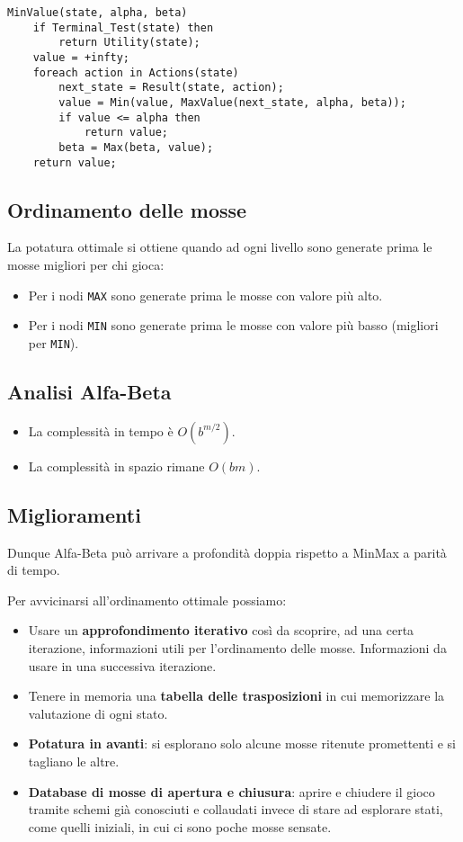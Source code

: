 \begin{lstlisting}[style=pseudo-style]
MinValue(state, alpha, beta)
	if Terminal_Test(state) then
		return Utility(state);
	value = +infty;
	foreach action in Actions(state)
		next_state = Result(state, action);
		value = Min(value, MaxValue(next_state, alpha, beta));
		if value <= alpha then
			return value;
		beta = Max(beta, value);
	return value;
\end{lstlisting}

\subsection{Ordinamento delle mosse}
La potatura ottimale si ottiene quando ad ogni livello sono generate prima le mosse migliori per chi gioca:
\begin{itemize}
	\item Per i nodi \verb|MAX| sono generate prima le mosse con valore pi\`u alto.
	\item Per i nodi \verb|MIN| sono generate prima le mosse con valore pi\`u basso (migliori per \verb|MIN|).
\end{itemize}

\subsection{Analisi Alfa-Beta}
\begin{itemize}
	\item La complessit\`a in tempo \`e $O(b^{m/2})$.
	\item La complessit\`a in spazio rimane $O(bm)$.
\end{itemize}

\subsection{Miglioramenti}
Dunque Alfa-Beta pu\`o arrivare a profondit\`a doppia rispetto a MinMax a parit\`a di tempo.

Per avvicinarsi all'ordinamento ottimale possiamo:
\begin{itemize}
	\item Usare un \textbf{approfondimento iterativo} cos\`i da scoprire,
	      ad una certa iterazione, informazioni utili per l'ordinamento delle mosse. Informazioni da usare
	      in una successiva iterazione.
	\item Tenere in memoria una \textbf{tabella delle trasposizioni} in cui memorizzare la valutazione di ogni stato.
	\item \textbf{Potatura in avanti}: si esplorano solo alcune mosse ritenute promettenti e si tagliano le altre.
	\item \textbf{Database di mosse di apertura e chiusura}: aprire e chiudere il gioco tramite schemi gi\`a conosciuti
	      e collaudati invece di stare ad esplorare stati, come quelli iniziali, in cui ci sono poche mosse sensate.
\end{itemize}